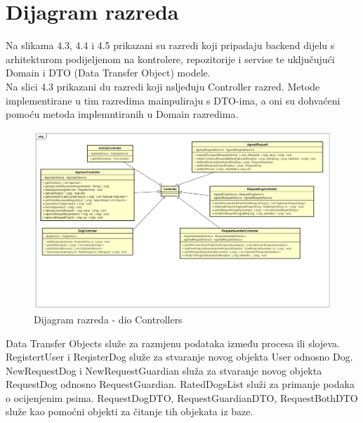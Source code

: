 			\eject
			
			
		\section{Dijagram razreda}
		
			Na slikama 4.3, 4.4 i 4.5 prikazani su razredi koji pripadaju backend dijelu s arhitekturom podijeljenom na kontrolere, repozitorije i servise te uključujući Domain i DTO (Data Transfer Object) modele.\\
			Na slici 4.3 prikazani du razredi koji nsljeđuju Controller razred. Metode implementirane u tim razredima mainpuliraju s DTO-ima, a oni su dohvaćeni pomoću metoda implemntiranih u Domain razredima.
			
			\begin{figure}[htb]
				\centering
				\includegraphics[width=16cm]{slike/class_diagram_controllers}
				\caption{Dijagram razreda - dio Controllers} 
				\label{fig:Class-Diagram}
			\end{figure}
		
		
			Data Transfer Objects služe za razmjenu podataka između procesa ili slojeva.\\
			RegistertUser i ReqisterDog služe za stvaranje novog objekta User odnosno Dog.
			NewRequestDog i NewRequestGuardian služa za stvaranje novog objekta RequestDog odnosno RequestGuardian.
			RatedDogsList služi za primanje podaka o ocijenjenim psima.
			RequestDogDTO, RequestGuardianDTO, RequestBothDTO služe kao pomoćni objekti za čitanje tih objekata iz baze.
			\eject
			
